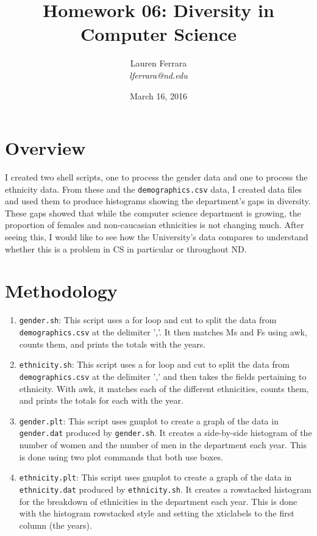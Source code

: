 \documentclass[letterpaper]{article}
\title{Homework 06: Diversity in Computer Science}
\date{March 16, 2016}
\author{Lauren Ferrara\\
\it{lferrara@nd.edu}}
\begin{document}
\maketitle


\section*{Overview}

I created two shell scripts, one to process the gender data and one to process the ethnicity data. From these and the {\tt demographics.csv} data, I created data files and used them to produce histograms showing the department's gaps in diversity. These gaps showed that while the computer science department is growing, the proportion of females and non-caucasian ethnicities is not changing much. After seeing this, I would like to see how the University's data compares to understand whether this is a problem in CS in particular or throughout ND.


\section*{Methodology}

\begin{enumerate}

\item{\tt gender.sh}: This script uses a for loop and cut to split the data from {\tt demographics.csv} at the delimiter ','. It then matches Ms and Fs using awk, counts them, and prints the totals with the years.

\item{\tt ethnicity.sh}: This script uses a for loop and cut to split the data from {\tt demographics.csv} at the delimiter ',' and then takes the fields pertaining to ethnicity. With awk, it matches each of the different ethnicities, counts them, and prints the totals for each with the year.

\item{\tt gender.plt}: This script uses gnuplot to create a graph of the data in {\tt gender.dat} produced by {\tt gender.sh}. It creates a side-by-side histogram of the number of women and the number of men in the department each year. This is done using two plot commands that both use boxes.

\item{\tt ethnicity.plt}: This script uses gnuplot to create a graph of the data in {\tt ethnicity.dat} produced by {\tt ethnicity.sh}. It creates a rowstacked histogram for the breakdown of ethnicities in the department each year. This is done with the histogram rowstacked style and setting the xticlabels to the first column (the years).

\end{enumerate}
\end{document}
